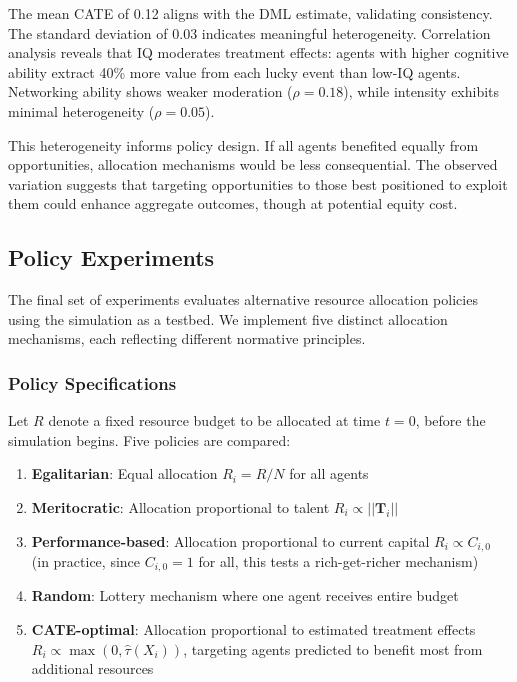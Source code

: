The mean CATE of 0.12 aligns with the DML estimate, validating consistency.
The standard deviation of 0.03 indicates meaningful heterogeneity. Correlation
analysis reveals that IQ moderates treatment effects: agents with higher
cognitive ability extract 40\% more value from each lucky event than low-IQ
agents. Networking ability shows weaker moderation ($\rho = 0.18$), while
intensity exhibits minimal heterogeneity ($\rho = 0.05$).

This heterogeneity informs policy design. If all agents benefited
equally from opportunities, allocation mechanisms would be less consequential.
The observed variation suggests that targeting opportunities to those
best positioned to exploit them could enhance aggregate outcomes, though
at potential equity cost.

\subsection{Policy Experiments}

The final set of experiments evaluates alternative resource allocation
policies using the simulation as a testbed. We implement five distinct allocation
mechanisms, each reflecting different normative principles.

\subsubsection{Policy Specifications}

Let $R$ denote a fixed resource budget to be allocated at time $t=0$,
before the simulation begins. Five policies are compared:

\begin{enumerate}
  \item \textbf{Egalitarian}: Equal allocation $R_{i} = R/N$ for all agents

  \item \textbf{Meritocratic}: Allocation proportional to talent $R_{i} \propto
    ||\mathbf{T}_{i}||$

  \item \textbf{Performance-based}: Allocation proportional to current capital
    $R_{i} \propto C_{i,0}$ (in practice, since $C_{i,0}=1$ for all,
    this tests a rich-get-richer mechanism)

  \item \textbf{Random}: Lottery mechanism where one agent receives entire
    budget

  \item \textbf{CATE-optimal}: Allocation proportional to estimated treatment
    effects $R_{i} \propto \max(0, \hat{\tau}(X_{i}))$, targeting agents
    predicted to benefit most from additional resources
\end{enumerate}

